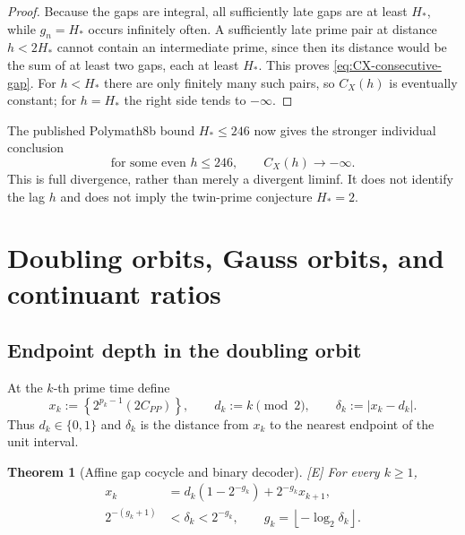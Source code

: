 \documentclass[11pt]{article}
\newtheorem{theorem}{Theorem}[section]
\theoremstyle{definition}
\theoremstyle{remark}
\newcommand{\status}[1]{\textnormal{\textcolor{accent}{\footnotesize[#1]}}}
\begin{document}
\begin{proof}
Because the gaps are integral, all sufficiently late gaps are at least $H_*$, while
$g_n=H_*$ occurs infinitely often.  A sufficiently late prime pair at distance
$h<2H_*$ cannot contain an intermediate prime, since then its distance would be the sum
of at least two gaps, each at least $H_*$.  This proves \eqref{eq:CX-consecutive-gap}.
For $h<H_*$ there are only finitely many such pairs, so $C_X(h)$ is eventually constant;
for $h=H_*$ the right side tends to $-\infty$.
\end{proof}

The published Polymath8b bound $H_*\le246$ \cite{Polymath8b} now gives the stronger
individual conclusion
\begin{equation}\label{eq:published-246}
 \text{for some even }h\le246,\qquad C_X(h)\longrightarrow-\infty.
\end{equation}
This is full divergence, rather than merely a divergent liminf.  It does not identify the
lag $h$ and does not imply the twin-prime conjecture $H_*=2$.

\section{Doubling orbits, Gauss orbits, and continuant ratios}

\subsection{Endpoint depth in the doubling orbit}

At the $k$-th prime time define
\begin{equation}\label{eq:xk-delta}
 x_k:=\left\{2^{p_k-1}(2C_{PP})\right\},\qquad
 d_k:=k\pmod2,\qquad
 \delta_k:=|x_k-d_k|.
\end{equation}
Thus $d_k\in\{0,1\}$ and $\delta_k$ is the distance from $x_k$ to the nearest endpoint
of the unit interval.

\begin{theorem}[Affine gap cocycle and binary decoder]\label{thm:binary-gap-decoder}
\status{E}
For every $k\ge1$,
\begin{align}
 x_k&=d_k(1-2^{-g_k})+2^{-g_k}x_{k+1},\label{eq:affine-gap-cocycle}\\
 2^{-(g_k+1)}&<\delta_k<2^{-g_k},\qquad
 g_k=\left\lfloor-\log_2\delta_k\right\rfloor.\label{eq:delta-decoder}
\end{align}
\end{theorem}
\end{document}
